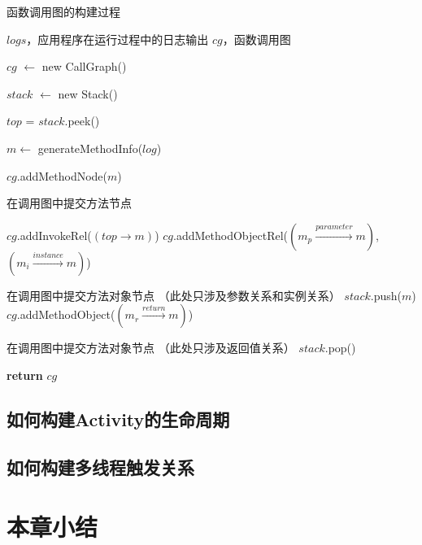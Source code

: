 \begin{algorithm}[h] 
	\caption{函数调用图的构建过程} 

\begin{algorithmic}[1]
	\label{trans}
		
	 \small
	\REQUIRE  $logs$，应用程序在运行过程中的日志输出
	\ENSURE $cg$，函数调用图
	
	
	
	
	\STATE 	$cg$ $\gets$ new CallGraph()
	
		\STATE 	$stack$ $\gets$ new Stack()
		
				\STATE 	$top$ = $stack$.peek()                 
			
			
			
					\STATE 	$m \gets $ generateMethodInfo($log$)
					
					\STATE  $cg$.addMethodNode($m$)
					
					
					\Comment 在调用图中提交方法节点 
					
						\STATE 	$cg$.addInvokeRel($ ( top \to  m ) $) 						
						\STATE 	$cg$.addMethodObjectRel($ (  m_p \stackrel{parameter}{\longrightarrow}   m )  $,$ (  m_i \stackrel{instance}{\longrightarrow}   m ) $) 
				
				
						\Comment 在调用图中提交方法对象节点 （此处只涉及参数关系和实例关系）
							\STATE 	$stack$.push($m$)
					\ENDIF
			\ELSE 
					\STATE 	$cg$.addMethodObject($ (  m_r \stackrel{return}{\longrightarrow}   m )  $) 
					
					
					\Comment 在调用图中提交方法对象节点 （此处只涉及返回值关系）
					\STATE 		$stack$.pop() 

			\ENDIF

		\ENDFOR
	
	
	\ENDFOR
	
 \STATE \textbf{return}   $cg$
	

\end{algorithmic}
\end{algorithm}



\subsection{如何构建Activity的生命周期}

\subsection{如何构建多线程触发关系}

\section{本章小结}
